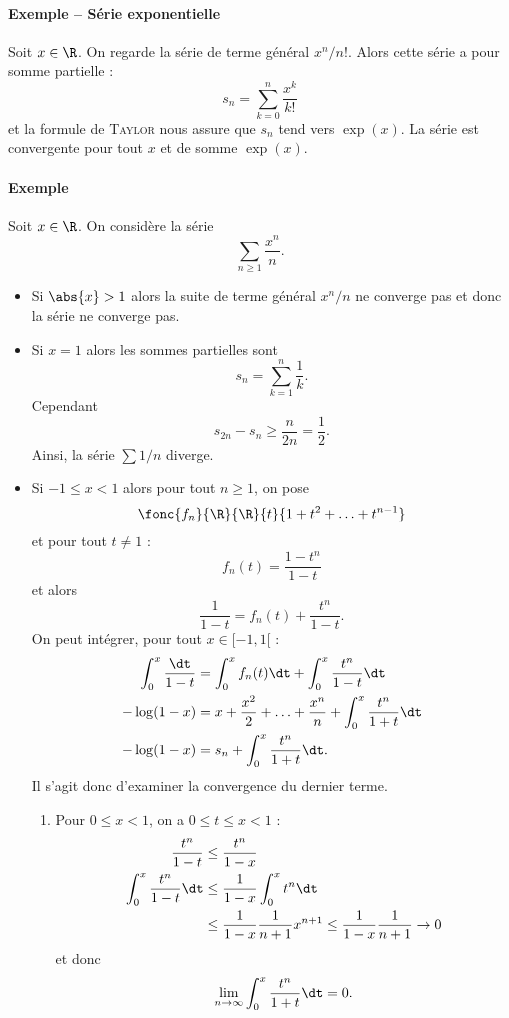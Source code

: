 \documentclass{mybourbaki}
\begin{document}
\paragraph{Exemple -- Série exponentielle}Soit $x\in \R$. On regarde la série de terme général $x^{n}/n!$. Alors cette série a pour somme partielle : \[s_n = \sum_{k=0}^{n}\frac{x^{k}}{k!}\]et la formule de \textsc{Taylor} nous assure que $s_n$ tend vers $\exp(x)$. La série est convergente pour tout $x$ et de somme $\exp(x)$.

\paragraph{Exemple}Soit $x\in \R$. On considère la série \[ \sum_{n\geq 1}\frac{x^{n}}{n}.\]
\begin{itemize}
\item Si $\abs{x}>1$ alors la suite de terme général $x^{n}/n$ ne converge pas et donc la série ne converge pas.
\item Si $x=1$ alors les sommes partielles sont \[ s_n = \sum_{k=1}^{n}\frac{1}{k}.\]Cependant \[ s_{2n} - s_n \geq \frac{n}{2n} = \frac{1}{2}.\]Ainsi, la série $\sum 1/n$ diverge.
\item Si $-1\leq x<1$ alors pour tout $n\geq 1$, on pose \[ \fonc{f_n}{\R}{\R}{t}{1+t^{2}+\ldots+t^{n-1}}\]et pour tout $t\neq 1$ : \[f_{n}(t) = \frac{1-t^{n}}{1-t} \]et alors \[\frac{1}{1-t}= f_n(t) + \frac{t^{n}}{1-t}. \]On peut intégrer, pour tout $x\in[-1,1[$ : 
\begin{align*}
\int_{0}^{x}\frac{\dt}{1-t} &= \int_{0}^{x}f_n(t)\dt + \int_{0}^{x}\frac{t^{n}}{1-t}\dt\\
-\log(1-x) &= x + \frac{x^{2}}{2} +\ldots + \frac{x^{n}}{n} + \int_{0}^{x}\frac{t^{n}}{1+t}\dt\\
-\log(1-x) &= s_n+ \int_{0}^{x}\frac{t^{n}}{1+t}\dt.
\end{align*}
Il s'agit donc d'examiner la convergence du dernier terme. 
\begin{enumerate}
\item Pour $0\leq x < 1$, on a $0\leq t \leq x < 1$ : 
\begin{align*}
\frac{t^{n}}{1-t} &\leq \frac{t^{n}}{1-x} \\
\int_{0}^{x}\frac{t^{n}}{1-t}\dt &\leq \frac{1}{1-x}\int_{0}^{x}t^{n}\dt \\
&\leq \frac{1}{1-x}\frac{1}{n+1}x^{n+1}\leq \frac{1}{1-x}\frac{1}{n+1} \to 0
\end{align*}
et donc \[ \lim_{n\to\infty} \int_{0}^{x}\frac{t^{n}}{1+t}\dt = 0. \]

\end{enumerate}
\end{itemize}
\end{document}
